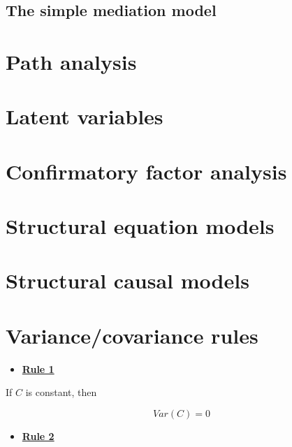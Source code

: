 \documentclass[
]{book}
\providecommand{\tightlist}{%
  \setlength{\itemsep}{0pt}\setlength{\parskip}{0pt}}
\begin{document}
\hypertarget{mediation-simple}{%
\section{The simple mediation model}\label{mediation-simple}}

\hypertarget{path}{%
\chapter{Path analysis}\label{path}}

\hypertarget{latent}{%
\chapter{Latent variables}\label{latent}}

\hypertarget{cfa}{%
\chapter{Confirmatory factor analysis}\label{cfa}}

\hypertarget{sem}{%
\chapter{Structural equation models}\label{sem}}

\hypertarget{scm}{%
\chapter{Structural causal models}\label{scm}}

\hypertarget{appendix-appendix}{%
\appendix}


\hypertarget{appendix-rules}{%
\chapter{Variance/covariance rules}\label{appendix-rules}}

\begin{itemize}
\tightlist
\item
  \href{./variance.html\#Rule1}{\textbf{Rule 1}}
\end{itemize}

If \(C\) is constant, then

\[
Var\left(C\right) = 0
\]

\begin{itemize}
\tightlist
\item
  \href{./variance.html\#Rule2}{\textbf{Rule 2}}
\end{itemize}
\end{document}
